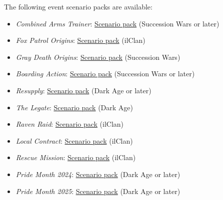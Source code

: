 The following event scenario packs are available:

\begin{itemize}

\item \emph{Combined Arms Trainer}: \href{https://raw.githubusercontent.com/Eudicods/outworlds-wastes/rules-pdf/combined-arms-trainer.pdf}{Scenario pack} (Succession Wars or later)

\item \emph{Fox Patrol Origins}: \href{https://raw.githubusercontent.com/Eudicods/outworlds-wastes/rules-pdf/fox-patrol-origins.pdf}{Scenario pack} (ilClan)

\item \emph{Gray Death Origins}: \href{https://raw.githubusercontent.com/Eudicods/outworlds-wastes/rules-pdf/gray-death-origins.pdf}{Scenario pack} (Succession Wars)

\item \emph{Boarding Action}: \href{https://raw.githubusercontent.com/Eudicods/outworlds-wastes/rules-pdf/boarding-action.pdf}{Scenario pack} (Succession Wars or later)

\item \emph{Resupply}: \href{https://raw.githubusercontent.com/Eudicods/outworlds-wastes/rules-pdf/resupply.pdf}{Scenario pack} (Dark Age or later)

\item \emph{The Legate}: \href{https://raw.githubusercontent.com/Eudicods/outworlds-wastes/rules-pdf/the-legate.pdf}{Scenario pack} (Dark Age)

\item \emph{Raven Raid}: \href{https://raw.githubusercontent.com/Eudicods/outworlds-wastes/rules-pdf/raven-raid.pdf}{Scenario pack} (ilClan)

\item \emph{Local Contract}: \href{https://raw.githubusercontent.com/Eudicods/outworlds-wastes/rules-pdf/local-contract.pdf}{Scenario pack} (ilClan)

\item \emph{Rescue Mission}: \href{https://raw.githubusercontent.com/Eudicods/outworlds-wastes/rules-pdf/rescue-mission.pdf}{Scenario pack} (ilClan)

\item \emph{Pride Month 2024}: \href{https://raw.githubusercontent.com/Eudicods/outworlds-wastes/rules-pdf/pride-2024.pdf}{Scenario pack} (Dark Age or later)

\item \emph{Pride Month 2025}: \href{https://raw.githubusercontent.com/Eudicods/outworlds-wastes/rules-pdf/pride-2025.pdf}{Scenario pack} (Dark Age or later)

\end{itemize}
